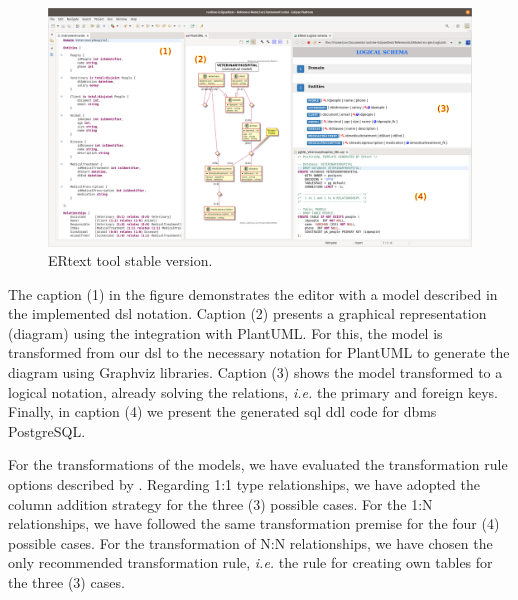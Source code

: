 \begin{figure} [!htb]
    \centering
    \caption{ERtext tool stable version.}
    \label{fig:stableVersion}
    \includegraphics[width=1\textwidth]{img/ToolOverview2.png}
\end{figure}

The caption (1) in the figure demonstrates the editor with a model described in the implemented \ac{dsl} notation.
Caption (2) presents a graphical representation (diagram) using the integration with PlantUML.
For this, the model is transformed from our \ac{dsl} to the necessary notation for PlantUML to generate the diagram using Graphviz libraries.
Caption (3) shows the model transformed to a logical notation, already solving the relations, \textit{i.e.} the primary and foreign keys.
Finally, in caption (4) we present the generated \ac{sql} \ac{ddl} code for \ac{dbms} PostgreSQL.

For the transformations of the models, we have evaluated the transformation rule options described by \cite{Heuser:2009}.
Regarding 1:1 type relationships, we have adopted the column addition strategy for the three (3) possible cases.
For the 1:N relationships, we have followed the same transformation premise for the four (4) possible cases.
For the transformation of N:N relationships, we have chosen the only recommended transformation rule, \textit{i.e.} the rule for creating own tables for the three (3) cases.

